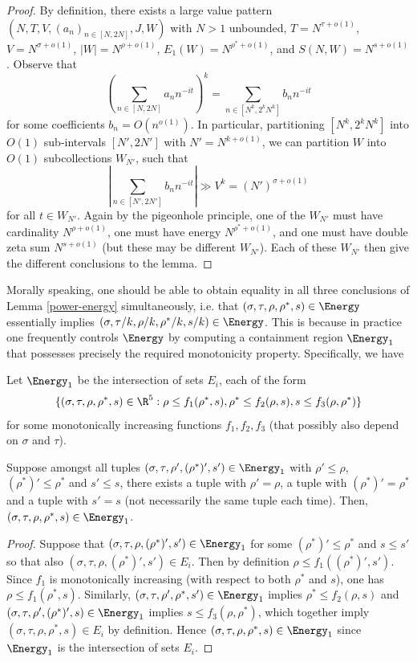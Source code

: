 \begin{proof} By definition, there exists a large value pattern $(N,T,V,(a_n)_{n \in [N,2N]},J,W)$ with $N > 1$ unbounded, $T = N^{\tau+o(1)}$, $V = N^{\sigma+o(1)}$, $|W| = N^{\rho+o(1)}$, $E_1(W) = N^{\rho^*+o(1)}$, and $S(N,W) = N^{s+o(1)}$.  Observe that
    $$ \left( \sum_{n \in [N,2N]} a_n n^{-it} \right)^k = \sum_{n \in [N^k, 2^k N^k]} b_n n^{-it}$$
for some coefficients $b_n = O(n^{o(1)})$.  In particular, partitioning $[N^k, 2^k N^k]$ into $O(1)$ sub-intervals $[N',2N']$ with $N' = N^{k+o(1)}$, we can partition $W$ into $O(1)$ subcollections $W_{N'}$, such that
$$ \left| \sum_{n \in [N',2N']} b_n n^{-it} \right| \gg V^k = (N')^{\sigma+o(1)}$$
for all $t \in W_{N'}$.  Again by the pigeonhole principle, one of the $W_{N'}$ must have cardinality $N^{\rho+o(1)}$, one must have energy $N^{\rho^*+o(1)}$, and one must have double zeta sum $N^{s+o(1)}$ (but these may be different $W_{N'}$).  Each of these $W_{N'}$ then give the different conclusions to the lemma.
\end{proof}

Morally speaking, one should be able to obtain equality in all three conclusions of Lemma \ref{power-energy} simultaneously, i.e. that $(\sigma,\tau,\rho,\rho^*,s) \in \Energy$ essentially implies $(\sigma,\tau/k,\rho/k,\rho^*/k,s/k) \in \Energy$. This is because in practice one frequently controls $\Energy$ by computing a containment region $\Energy_1$ that possesses precisely the required monotonicity property. Specifically, we have

\begin{lemma}\label{lver_e_mono_crit}
Let $\Energy_1$ be the intersection of sets $E_i$, each of the form
\begin{align*}
\{(\sigma, \tau, \rho, \rho^*, s) \in \R^5: \rho \le f_1(\rho^*, s), \rho^* \le f_2(\rho, s), s \le f_3(\rho, \rho^*)\}
\end{align*}
for some monotonically increasing functions $f_1, f_2, f_3$ (that possibly also depend on $\sigma$ and $\tau$).

Suppose amongst all tuples $(\sigma, \tau, \rho', (\rho^*)', s') \in \Energy_1$ with $\rho' \le \rho$, $(\rho^*)' \le \rho^*$ and $s' \le s$, there exists a tuple with $\rho' = \rho$, a tuple with $(\rho^*)' = \rho^*$ and a tuple with $s' = s$ (not necessarily the same tuple each time). Then, $(\sigma, \tau, \rho, \rho^*, s) \in \Energy_1$.
\end{lemma}
\begin{proof}
Suppose that $(\sigma, \tau, \rho, (\rho^*)', s') \in \Energy_1$ for some $(\rho^*)'\le \rho^*$ and $s \le s'$ so that also $(\sigma, \tau, \rho, (\rho^*)', s') \in E_i$. Then by definition $\rho \le f_1((\rho^*)', s')$. Since $f_1$ is monotonically increasing (with respect to both $\rho^*$ and $s$), one has $\rho \le f_1(\rho^*, s)$. Similarly, $(\sigma, \tau, \rho', \rho^*, s') \in \Energy_1$ implies $\rho^* \le f_2(\rho, s)$ and $(\sigma, \tau, \rho', (\rho^*)', s) \in \Energy_1$ implies $s \le f_3(\rho, \rho^*)$, which together imply $(\sigma, \tau, \rho, \rho^*, s) \in E_i$ by definition. Hence $(\sigma, \tau, \rho, \rho^*, s) \in \Energy_1$ since $\Energy_1$ is the intersection of sets $E_i$.
\end{proof}


